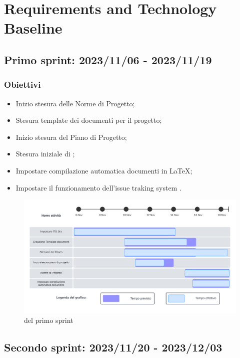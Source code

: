 \section{Requirements and Technology Baseline}
\label{pianificazione:rtb}

\subsection{Primo sprint: 2023/11/06 - 2023/11/19}
\subsubsection{Obiettivi}
\begin{itemize}[itemsep=-2pt]
    \item Inizio stesura delle Norme di Progetto;
    \item Stesura template dei documenti per il progetto;
    \item Inizio stesura del Piano di Progetto;
    \item Stesura iniziale di ;
    \item Impostare compilazione automatica documenti in LaTeX;
    \item Impostare il funzionamento dell'issue traking system .
\end{itemize}

\begin{figure}[h!]
    \centering  
    \includegraphics[width=\textwidth]{Roadmap1sprint.png}
    \caption{ del primo sprint}
    \label{fig:roadmap1s}
\end{figure}
\newpage

\subsection{Secondo sprint: 2023/11/20 - 2023/12/03}
